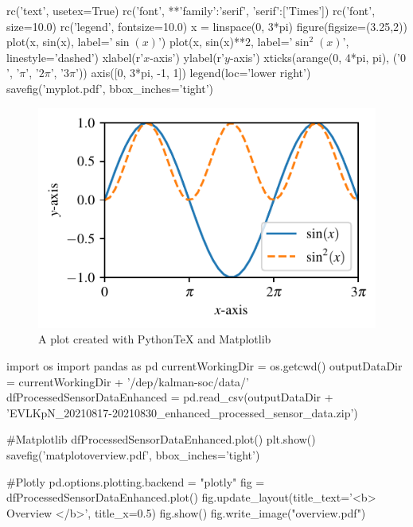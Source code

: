 \begin{pylabcode}[plotsession]
rc('text', usetex=True)
rc('font', **{'family':'serif', 'serif':['Times']})
rc('font', size=10.0)			
rc('legend', fontsize=10.0)
x = linspace(0, 3*pi)
figure(figsize=(3.25,2))
plot(x, sin(x), label='$\sin(x)$')
plot(x, sin(x)**2, label='$\sin^2(x)$',
linestyle='dashed')
xlabel(r'$x$-axis')
ylabel(r'$y$-axis')
xticks(arange(0, 4*pi, pi), ('$0$',
'$\pi$', '$2\pi$', '$3\pi$'))
axis([0, 3*pi, -1, 1])
legend(loc='lower right')
savefig('myplot.pdf', bbox_inches='tight')
\end{pylabcode}

\begin{figure}[!ht]
\includegraphics{myplot}
\caption{\label{fig:matplotlib} A plot created with PythonTeX and Matplotlib}
\end{figure}

\begin{pylabcode}
import os 
import pandas as pd
currentWorkingDir =  os.getcwd()
outputDataDir = currentWorkingDir + '/dep/kalman-soc/data/'
dfProcessedSensorDataEnhanced = pd.read_csv(outputDataDir + 'EVLKpN_20210817-20210830_enhanced_processed_sensor_data.zip')  

#Matplotlib
dfProcessedSensorDataEnhanced.plot()
plt.show()
savefig('matplotoverview.pdf', bbox_inches='tight')

#Plotly
pd.options.plotting.backend = "plotly"
fig = dfProcessedSensorDataEnhanced.plot()
fig.update_layout(title_text='<b> Overview  </b>', title_x=0.5)
fig.show()
fig.write_image("overview.pdf")
\end{pylabcode}
	
